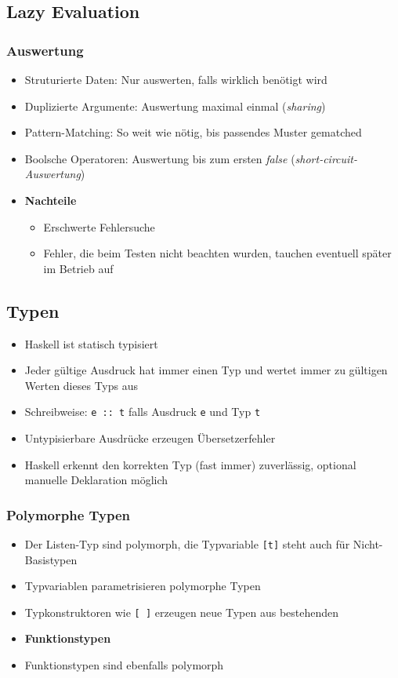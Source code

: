 \subsection{Lazy Evaluation}

\subsubsection{Auswertung}
\begin{itemize}
	\item Struturierte Daten: Nur auswerten, falls wirklich benötigt wird
	\item Duplizierte Argumente: Auswertung maximal einmal (\textit{sharing})
	\item Pattern-Matching: So weit wie nötig, bis passendes Muster gematched
	\item Boolsche Operatoren: Auswertung bis zum ersten \textit{false} (\textit{short-circuit-Auswertung})
	\item \textbf{Nachteile}
	\begin{itemize}
		\item Erschwerte Fehlersuche
		\item Fehler, die beim Testen nicht beachten wurden, tauchen eventuell später im Betrieb auf
	\end{itemize}
\end{itemize}


\subsection{Typen}
\begin{itemize}
	\item Haskell ist statisch typisiert
	\item Jeder gültige Ausdruck hat immer einen Typ und wertet immer zu gültigen Werten dieses Typs aus
	\item Schreibweise: \texttt{e :: t} falls Ausdruck \texttt{e} und Typ \texttt{t}
	\item Untypisierbare Ausdrücke erzeugen Übersetzerfehler
	\item Haskell erkennt den korrekten Typ (fast immer) zuverlässig, optional manuelle Deklaration möglich
\end{itemize}

\subsubsection{Polymorphe Typen}
\begin{itemize}
	\item Der Listen-Typ sind polymorph, die Typvariable \texttt{{[}t{]}} steht auch für Nicht-Basistypen
	\item Typvariablen parametrisieren polymorphe Typen
	\item Typkonstruktoren wie \texttt{{[} {]}} erzeugen neue Typen aus bestehenden
	\item \textbf{Funktionstypen}
	\item Funktionstypen sind ebenfalls polymorph
\end{itemize}

